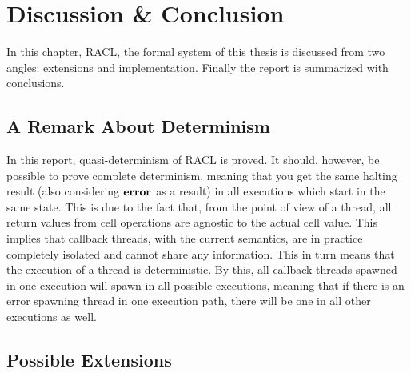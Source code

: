 \chapter{Discussion \& Conclusion}
\label{cha:discussion_and_conclusion}

In this chapter, RACL, the formal system of this thesis is discussed from two
angles: extensions and implementation. Finally the report is summarized with
conclusions.


\section{A Remark About Determinism}%
\label{sec:a_remark_about_determinism}

In this report, quasi-determinism of RACL is proved. It should, however,
be possible to prove complete determinism, meaning that you get the same
halting result (also considering $\mbox{{\bf error}}$ as a result) in all executions which
start in the same state. This is due to the fact that, from the point of view of a
thread, all return values from cell operations are agnostic to the actual
cell value.  This implies that callback threads, with the current semantics, are
in practice completely isolated and cannot share any information. This in turn
means that the execution of a thread is deterministic. By this, all callback
threads spawned in one execution will spawn in all possible executions, meaning
that if there is an error spawning thread in one execution path, there will be
one in all other executions as well.

\section{Possible Extensions}%
\label{sec:extensions}


